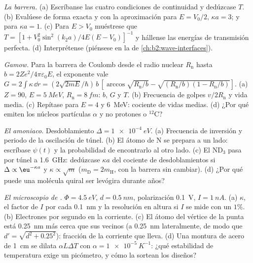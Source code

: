\begin{exercise}[$\star\star$]\label{exo:b2:potential-wells-tunneling:8}
\emph{La barrera.} (a) Escríbanse las cuatro condiciones de continuidad y
dedúzcase $T$. (b) Evalúese de forma exacta y con la aproximación para $E =
V_0/2$, $\kappa a = 3$; y para $\kappa a = 1$. (c) Para $E > V_0$ muéstrese que $T = [1 +
V_0^2\sin^2(k_2a)/4E(E - V_0)]^{-1}$ y hállense las energías de transmisión
perfecta. (d) Interprétense (piénsese en la  de
\cref{ch:b2:wave-interfaces}).
\end{exercise}

\begin{exercise}[$\star\star$]\label{exo:b2:potential-wells-tunneling:9}
\emph{Gamow.} Para la barrera de Coulomb desde el radio nuclear $R_{\text{n}}$
hasta $b = 2Ze^2/4\pi\varepsilon_0E$, el exponente vale $G = 2\int\kappa\,\dd r =
(2\sqrt{2mE}/\hbar)\,b\,[\arccos\sqrt{R_{\text{n}}/b} - \sqrt{(R_{\text{n}}/b)(1 -
R_{\text{n}}/b)}]$. (a) $Z = 90$, $E = \qty{5}{MeV}$, $R_{\text{n}} = \qty{8}{fm}$:
$b$, $G$ y $T$. (b) Frecuencia de golpes $v/2R_{\text{n}}$ y vida media. (c)
Repítase para $E = 4$ y \qty{6}{MeV}: cociente de vidas medias. (d) ¿Por qué emiten los
núcleos partículas $\alpha$ y no protones o $^{12}$C?
\end{exercise}

\begin{exercise}[$\star\star\star$]\label{exo:b2:potential-wells-tunneling:10}
\emph{El amoniaco.} Desdoblamiento $\Delta = \qty{1e-4}{eV}$. (a) Frecuencia de inversión
y periodo de la oscilación de túnel. (b) El átomo de N se
prepara a un lado: escríbase $\psi(t)$ y la probabilidad de encontrarlo
al otro lado. (c) El ND$_3$ pasa por túnel a \qty{1.6}{GHz}: dedúzcase $\kappa a$
del cociente de desdoblamientos si $\Delta \propto \eu^{-\kappa a}$ y $\kappa
\propto\sqrt m$ ($m_{\text{D}} = 2m_{\text{H}}$, con la barrera sin cambiar). (d) ¿Por qué puede
una molécula quiral ser levógira durante años?
\end{exercise}

\begin{exercise}[$\star\star\star$]\label{exo:b2:potential-wells-tunneling:11}
\emph{El microscopio de .} $\Phi = \qty{4.5}{eV}$, $d = \qty{0.5}{nm}$, polarización \qty{0.1}{V},
$I = \qty{1}{nA}$. (a) $\kappa$, el factor de $I$ por cada \qty{0.1}{nm} y la
resolución en altura si $I$ se mide con un $1\%$. (b) Electrones por segundo
en la corriente. (c) El átomo del vértice de la punta está \qty{0.25}{nm} más cerca que sus
vecinos (a \qty{0.25}{nm} lateralmente, de modo que $d' = \sqrt{d^2 + 0.25^2}$):
fracción de la corriente que lleva. (d) Una montura de acero de \qty{1}{cm} se dilata
$\alpha L\Delta T$ con $\alpha = \qty{1e-5}{K^{-1}}$: ¿qué estabilidad de temperatura
exige un picómetro, y cómo la sortean los diseños?
\end{exercise}

